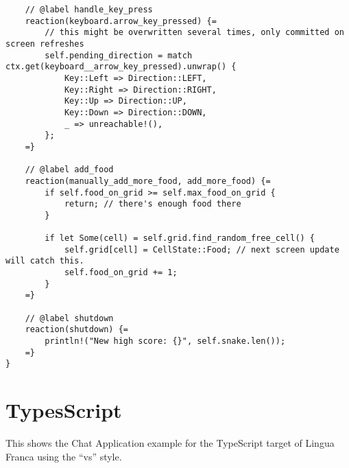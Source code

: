 \documentclass{article}
\begin{document}
\begin{verbatim}
    // @label handle_key_press
    reaction(keyboard.arrow_key_pressed) {=
        // this might be overwritten several times, only committed on screen refreshes
        self.pending_direction = match ctx.get(keyboard__arrow_key_pressed).unwrap() {
            Key::Left => Direction::LEFT,
            Key::Right => Direction::RIGHT,
            Key::Up => Direction::UP,
            Key::Down => Direction::DOWN,
            _ => unreachable!(),
        };
    =}

    // @label add_food
    reaction(manually_add_more_food, add_more_food) {=
        if self.food_on_grid >= self.max_food_on_grid {
            return; // there's enough food there
        }

        if let Some(cell) = self.grid.find_random_free_cell() {
            self.grid[cell] = CellState::Food; // next screen update will catch this.
            self.food_on_grid += 1;
        }
    =}

    // @label shutdown
    reaction(shutdown) {=
        println!("New high score: {}", self.snake.len());
    =}
}
\end{verbatim}


\newpage
\section{TypesScript}

This shows the Chat Application example for the TypeScript target of Lingua Franca using the
``vs'' style.
\end{document}
